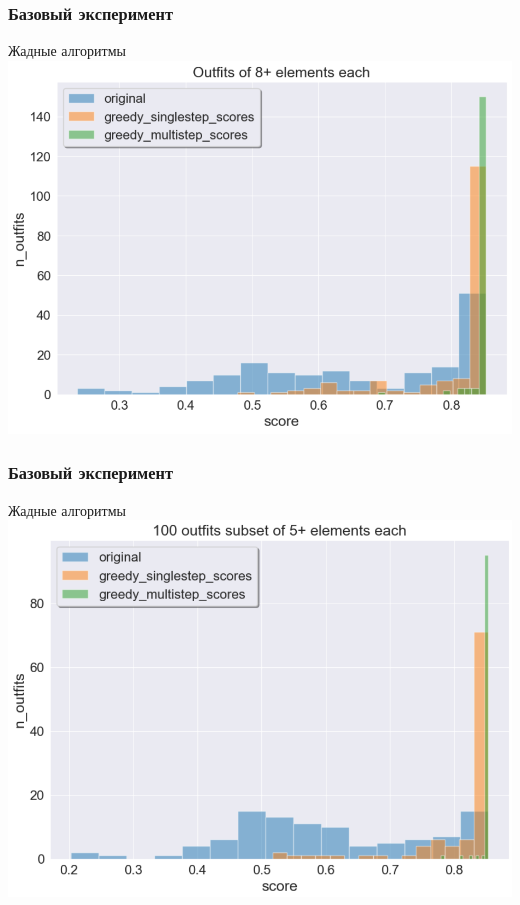 \documentclass[10pt]{beamer}
\begin{document}
\begin{frame}
	\frametitle{Базовый эксперимент}
	\begin{block}{Жадные алгоритмы}
		\includegraphics[scale = 0.52]{figures/greedy_at_least_8.png}
	\end{block}
\end{frame}


\begin{frame}
	\frametitle{Базовый эксперимент}
	\begin{block}{Жадные алгоритмы}
		\includegraphics[scale = 0.52]{figures/greedy_at_least_5_subset100.png}
	\end{block}
\end{frame}
\end{document}
